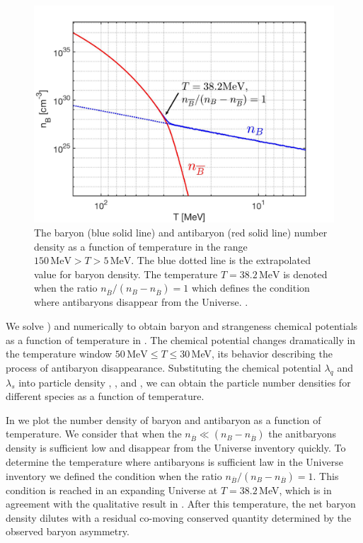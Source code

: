 \begin{figure} 
\centerline{\includegraphics[width=0.9\linewidth]{./plots/Baryon_Antibaryon_cm.jpg}}
\caption{The baryon (blue solid line) and antibaryon (red solid line) number density as a function of temperature in the range $150\,\mathrm{MeV}>T>5\,\mathrm{MeV}$. The blue dotted line is the extrapolated value for baryon density. The temperature $T=38.2\,\mathrm{MeV}$ is denoted when the ratio $n_{\overline B}/(n_B-n_{\overline B})=1$ which defines the condition where antibaryons disappear from the Universe. . }
\label{Baryon_fig}
\end{figure}


We solve  ) and  numerically to obtain baryon and strangeness chemical potentials as a function of temperature in  . The chemical potential changes dramatically in the temperature window $50\,\mathrm{MeV}\le T\le 30$\,MeV, its behavior describing the process of antibaryon disappearance. Substituting the chemical potential $\lambda_q$ and $\lambda_s$ into particle density , , and , we can obtain the particle number densities for different species as a function of temperature.

In  we plot the number density of baryon and antibaryon as a function of temperature. We consider that when the  $n_{\overline B}\ll(n_B-n_{\overline B})$ the anitbaryons density is sufficient low and disappear from the Universe inventory quickly. To determine the temperature where antibaryons is sufficient law in the Universe inventory we defined the condition when the ratio $n_{\overline B}/(n_B-n_{\overline B})=1$. This condition is reached in an expanding Universe at $T=38.2$\,MeV, which is in agreement with the qualitative result in \cite{Kolb:1990vq}. After this temperature, the net baryon density dilutes with a residual co-moving conserved quantity determined by the observed baryon asymmetry.

